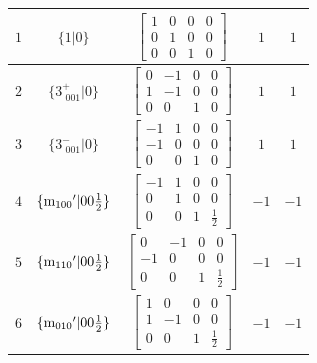\documentclass[fleqn,8pt]{jsarticle}
\begin{document}
\begin{longtable}{ccccc}
$ 1 $ & $ \{1|0\} $ & $ \begin{bmatrix} 1 & 0 & 0 & 0 \\ 0 & 1 & 0 & 0 \\ 0 & 0 & 1 & 0 \end{bmatrix} $ & $ 1 $ & $ 1 $ \\ \hline
$ 2 $ & $ \{3^{+}_{\,\,001}|0\} $ & $ \begin{bmatrix} 0 & -1 & 0 & 0 \\ 1 & -1 & 0 & 0 \\ 0 & 0 & 1 & 0 \end{bmatrix} $ & $ 1 $ & $ 1 $ \\ \hline
$ 3 $ & $ \{3^{-}_{\,\,001}|0\} $ & $ \begin{bmatrix} -1 & 1 & 0 & 0 \\ -1 & 0 & 0 & 0 \\ 0 & 0 & 1 & 0 \end{bmatrix} $ & $ 1 $ & $ 1 $ \\ \hline
$ 4 $ & $ \{{\rm m}_{100}{}'|0 0 \frac{1}{2}\} $ & $ \begin{bmatrix} -1 & 1 & 0 & 0 \\ 0 & 1 & 0 & 0 \\ 0 & 0 & 1 & \frac{1}{2} \end{bmatrix} $ & $ -1 $ & $ -1 $ \\ \hline
$ 5 $ & $ \{{\rm m}_{110}{}'|0 0 \frac{1}{2}\} $ & $ \begin{bmatrix} 0 & -1 & 0 & 0 \\ -1 & 0 & 0 & 0 \\ 0 & 0 & 1 & \frac{1}{2} \end{bmatrix} $ & $ -1 $ & $ -1 $ \\ \hline
$ 6 $ & $ \{{\rm m}_{010}{}'|0 0 \frac{1}{2}\} $ & $ \begin{bmatrix} 1 & 0 & 0 & 0 \\ 1 & -1 & 0 & 0 \\ 0 & 0 & 1 & \frac{1}{2} \end{bmatrix} $ & $ -1 $ & $ -1 $ \\
\end{longtable}
\end{document}
